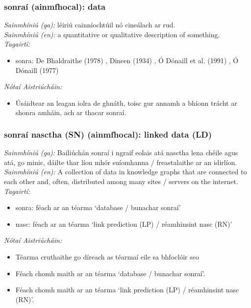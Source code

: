 \subsubsection*{sonraí (ainmfhocal): data}
 \noindent \textit{Sainmhíniú (ga):} léiriú cainníochtúil nó cineálach ar rud.
\\
 \noindent \textit{Sainmhíniú (en):} a quantitative or qualitative description of something.
\\
 \noindent \textit{Tagairtí:}
\begin{itemize}
	\item sonra: De Bhaldraithe (1978) \cite{de-bhaldraithe}, Dineen (1934) \cite{dineen}, Ó Dónaill et al. (1991) \cite{focloir-beag}, Ó Dónaill (1977) \cite{odonaill}
\end{itemize}

 \noindent \textit{Nótaí Aistriúcháin:}
\begin{itemize}
	\item Úsáidtear an leagan iolra de ghnáth, toisc gur annamh a bhíonn trácht ar shonra amháin, ach ar thacar sonraí.
\end{itemize}


\subsubsection*{sonraí nasctha (SN) (ainmfhocal): linked data (LD)}
 \noindent \textit{Sainmhíniú (ga):} Bailiúchán sonraí i ngraif eolais atá nasctha lena chéile agus atá, go minic, dáilte thar líon mhór suíomhanna / freastalaithe ar an idirlíon.
\\
 \noindent \textit{Sainmhíniú (en):} A collection of data in knowledge graphs that are connected to each other and, often, distributed among many sites / servers on the internet.
\\
 \noindent \textit{Tagairtí:}
\begin{itemize}
	\item sonra: féach ar an téarma `database / bunachar sonraí'
	\item nasc: féach ar an téarma `link prediction (LP) / réamhinsint nasc (RN)'
\end{itemize}

 \noindent \textit{Nótaí Aistriúcháin:}
\begin{itemize}
	\item Téarma cruthaithe go díreach as téarmaí eile sa bhfoclóir seo
	\item Féach chomh maith ar an téarma `database / bunachar sonraí'.
	\item Féach chomh maith ar an téarma `link prediction (LP) / réamhinsint nasc (RN)'.
\end{itemize}


